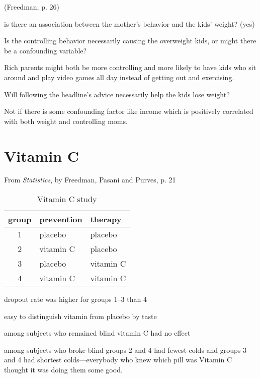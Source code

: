 \documentclass[landscape]{exam}
\begin{document}
  (Freedman, p. 26)

  \begin{itemize*}
    \item is there an association between the mother's behavior and the kids'
      weight? (yes)
    \item Is the controlling behavior necessarily causing the overweight kids,
      or might there be a confounding variable?

      \begin{solution}
        Rich parents might both be more controlling and more likely to have kids
        who sit around and play video games all day instead of getting out and
        exercising.
      \end{solution}

    \item Will following the headline's advice necessarily help the kids lose
      weight?

      \begin{solution}
        Not if there is some confounding factor like income which is positively
        correlated with both weight and controlling moms.
      \end{solution}

  \end{itemize*}

  \section{Vitamin C}

  From {\em Statistics}, by Freedman, Pasani and Purves, p. 21

  \begin{table}
    \centering
    \begin{tabular}{cll}
      \toprule
      group & prevention & therapy \\
      \midrule
      1     & placebo    & placebo \\
      2     & vitamin C  & placebo \\
      3     & placebo    & vitamin C \\
      4     & vitamin C  & vitamin C \\
    \end{tabular}
    \caption{Vitamin C study}\label{tab:vitamin.c}
  \end{table}

  \begin{itemize*} \item dropout rate was higher for groups 1--3 than 4
    \item easy to distinguish vitamin from placebo by taste
    \item among subjects who remained blind vitamin C had no effect
    \item among subjects who broke blind groups 2 and 4 had fewest colds and
      groups 3 and 4 had shortest colds---everybody who knew which pill was
      Vitamin C thought it was doing them some good.
  \end{itemize*}
\end{document}
